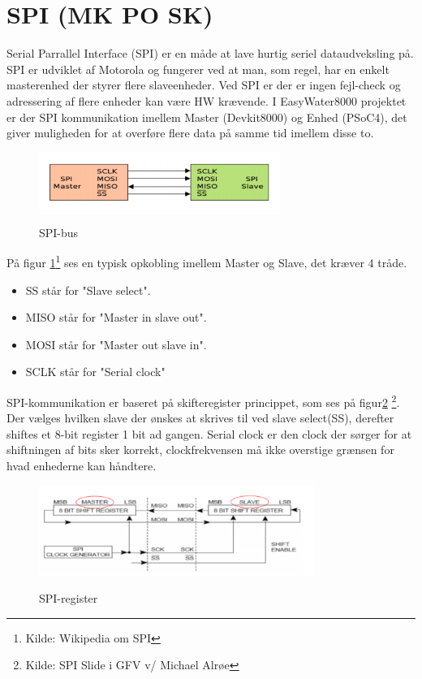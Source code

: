 \section{SPI (MK PO SK)}

Serial Parrallel Interface (SPI) er en måde at lave hurtig seriel dataudveksling på. SPI er udviklet af Motorola og fungerer ved at man, som regel, har en enkelt masterenhed der styrer flere slaveenheder. Ved SPI er der er ingen fejl-check og adressering af flere enheder kan være HW krævende. I EasyWater8000 projektet er der SPI kommunikation imellem Master (Devkit8000) og Enhed (PSoC4), det giver muligheden for at overføre flere data på samme tid imellem disse to.

\begin{figure}[H] \centering
{\includegraphics[width=0.7\textwidth]{billeder/design_spi_master_slave}}
\caption{SPI-bus}
\label{fig:design_spi_bus}
\raggedright
\end{figure}

På figur \ref{fig:design_spi_bus}\footnote{Kilde: Wikipedia om SPI} ses en typisk opkobling imellem Master og Slave, det kræver 4 tråde.

\begin{itemize}
 	\item SS står for "Slave select".
 	\item MISO står for "Master in slave out".
 	\item MOSI står for "Master out slave in". 
	\item SCLK står for "Serial clock" 
\end{itemize}

SPI-kommunikation er baseret på skifteregister princippet, som ses på figur\ref{fig:design_spi_register} \footnote{Kilde: SPI Slide i GFV v/ Michael Alrøe}. Der vælges hvilken slave der ønskes at skrives til ved slave select(SS), derefter shiftes et 8-bit register 1 bit ad gangen. Serial clock er den clock der sørger for at shiftningen af bits sker korrekt, clockfrekvensen må ikke overstige grænsen for hvad enhederne kan håndtere.

\begin{figure}[H] \centering
{\includegraphics[width=0.8\textwidth]{billeder/design_spi_register}}
\caption{SPI-register}
\label{fig:design_spi_register}
\raggedright
\end{figure}  

